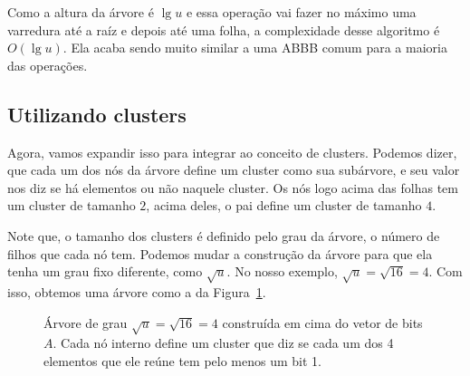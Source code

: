 Como a altura da árvore é $\lg u$ e essa operação vai fazer no máximo uma
varredura até a raíz e depois até uma folha, a complexidade desse algoritmo é
$O(\lg u)$. Ela acaba sendo muito similar a uma ABBB comum para a maioria das
operações.

\subsection{Utilizando clusters}

Agora, vamos expandir isso para integrar ao conceito de clusters. Podemos dizer,
que cada um dos nós da árvore define um cluster como sua subárvore, e seu valor
nos diz se há elementos ou não naquele cluster. Os nós logo acima das folhas tem
um cluster de tamanho $2$, acima deles, o pai define um cluster de tamanho $4$. 

Note que, o tamanho dos clusters é definido pelo grau da árvore, o número de
filhos que cada nó tem. Podemos mudar a construção da árvore para que ela tenha
um grau fixo diferente, como $\sqrt u$. No nosso exemplo, $\sqrt u = \sqrt{16} =
4$. Com isso, obtemos uma árvore como a da Figura~\ref{f:veb-clusters}.

\enlargethispage{1\baselineskip}

\begin{figure}[h]
\centering
{}
\caption{Árvore de grau $\sqrt u = \sqrt{16} = 4$ construída em cima do vetor de
bits $A$. Cada nó interno define um cluster que diz se cada um dos 4 elementos
que ele reúne tem pelo menos um bit 1.\label{f:veb-clusters}}
\end{figure}

